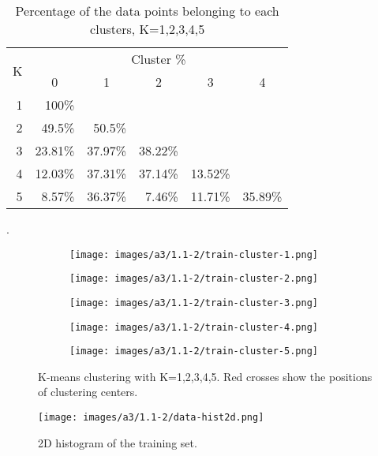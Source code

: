 \documentclass[12pt]{article}
\begin{document}
\begin{table}[!htb]
\centering
\begin{tabular}{|r|r|r|r|r|r|}
\hline
\multicolumn{1}{|c|}{\multirow{2}{*}{K}} & \multicolumn{5}{c|}{Cluster \%} \\ \cline{2-6} 
\multicolumn{1}{|c|}{} & \multicolumn{1}{c|}{0} & \multicolumn{1}{c|}{1} & \multicolumn{1}{c|}{2} & \multicolumn{1}{c|}{3} & \multicolumn{1}{c|}{4} \\ \hline
1 & 100\% &  &  &  &  \\ \hline
2 & 49.5\% & 50.5\% &  &  &  \\ \hline
3 & 23.81\% & 37.97\% & 38.22\% &  &  \\ \hline
4 & 12.03\% & 37.31\% & 37.14\% & 13.52\% &  \\ \hline
5 & 8.57\% & 36.37\% & 7.46\% & 11.71\% & 35.89\% \\ \hline
\end{tabular}
\caption{Percentage of the data points belonging to each clusters, K=1,2,3,4,5}.
\label{table:a3-1.1-2}
\end{table}


\begin{figure}[!htb]
\centering
\begin{subfigure}{.33\linewidth}
  \centering
  \texttt{[image: images/a3/1.1-2/train-cluster-1.png]}
\end{subfigure}%
\begin{subfigure}{.33\linewidth}
  \centering
  \texttt{[image: images/a3/1.1-2/train-cluster-2.png]}
\end{subfigure}
\begin{subfigure}{.33\linewidth}
  \centering
  \texttt{[image: images/a3/1.1-2/train-cluster-3.png]}
\end{subfigure}
\begin{subfigure}{.33\linewidth}
  \centering
  \texttt{[image: images/a3/1.1-2/train-cluster-4.png]}
\end{subfigure}
\begin{subfigure}{.33\linewidth}
  \centering
  \texttt{[image: images/a3/1.1-2/train-cluster-5.png]}
\end{subfigure}
\caption{K-means clustering with K=1,2,3,4,5.  Red crosses show the positions of clustering centers.}
\label{fig:a3-1.1-2}
\end{figure}


\begin{figure}[!htb]
\centering
\texttt{[image: images/a3/1.1-2/data-hist2d.png]}
\caption{2D histogram of the training set.}
\label{fig:a3-1.1-2-hist}
\end{figure}
\end{document}

